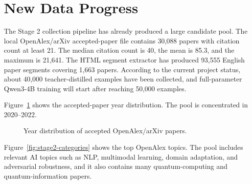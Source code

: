 \documentclass{article}
\begin{document}
\section{New Data Progress}

The Stage 2 collection pipeline has already produced a large candidate pool. The local OpenAlex/arXiv accepted-paper file contains 30,088 papers with citation count at least 21. The median citation count is 40, the mean is 85.3, and the maximum is 21,641. The HTML segment extractor has produced 93,555 English paper segments covering 1,663 papers. According to the current project status, about 40,000 teacher-distilled examples have been collected, and full-parameter Qwen3-4B training will start after reaching 50,000 examples.

\begin{table}[htbp]
    \centering
    \caption{Stage 2 collection and extraction statistics.}
    \label{tab:stage2-collection}
    
\end{table}

Figure~\ref{fig:stage2-years} shows the accepted-paper year distribution. The pool is concentrated in 2020--2022.

\begin{figure}[htbp]
    \centering
    \caption{Year distribution of accepted OpenAlex/arXiv papers.}
    \label{fig:stage2-years}
\end{figure}

Figure~\ref{fig:stage2-categories} shows the top OpenAlex topics. The pool includes relevant AI topics such as NLP, multimodal learning, domain adaptation, and adversarial robustness, and it also contains many quantum-computing and quantum-information papers.
\end{document}
